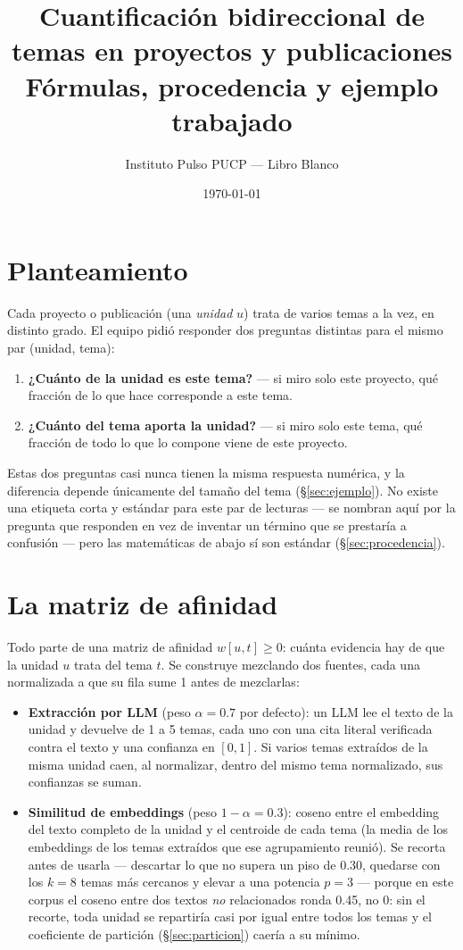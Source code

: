 \documentclass[11pt]{article}
\title{Cuantificación bidireccional de temas en proyectos y publicaciones\\
\large Fórmulas, procedencia y ejemplo trabajado}
\author{Instituto Pulso PUCP --- Libro Blanco}
\date{\today}
\newcommand{\afinidad}{w}
\begin{document}
\maketitle

\section{Planteamiento}

Cada proyecto o publicación (una \emph{unidad} $u$) trata de varios temas a la
vez, en distinto grado. El equipo pidió responder dos preguntas distintas
para el mismo par (unidad, tema):

\begin{enumerate}
  \item \textbf{¿Cuánto de la unidad es este tema?} --- si miro solo este
    proyecto, qué fracción de lo que hace corresponde a este tema.
  \item \textbf{¿Cuánto del tema aporta la unidad?} --- si miro solo este
    tema, qué fracción de todo lo que lo compone viene de este proyecto.
  \end{enumerate}

Estas dos preguntas casi nunca tienen la misma respuesta numérica, y la
diferencia depende únicamente del tamaño del tema (\S\ref{sec:ejemplo}). No
existe una etiqueta corta y estándar para este par de lecturas --- se nombran
aquí por la pregunta que responden en vez de inventar un término que se
prestaría a confusión --- pero las matemáticas de abajo sí son estándar
(\S\ref{sec:procedencia}).

\section{La matriz de afinidad}

Todo parte de una matriz de afinidad $\afinidad[u,t] \geq 0$: cuánta
evidencia hay de que la unidad $u$ trata del tema $t$. Se construye
mezclando dos fuentes, cada una normalizada a que su fila sume 1 antes de
mezclarlas:

\begin{itemize}
  \item \textbf{Extracción por LLM} (peso $\alpha = 0.7$ por defecto): un LLM
    lee el texto de la unidad y devuelve de 1 a 5 temas, cada uno con una
    cita literal verificada contra el texto y una confianza en $[0,1]$. Si
    varios temas extraídos de la misma unidad caen, al normalizar, dentro
    del mismo tema normalizado, sus confianzas se suman.
  \item \textbf{Similitud de embeddings} (peso $1-\alpha = 0.3$): coseno entre
    el embedding del texto completo de la unidad y el centroide de cada
    tema (la media de los embeddings de los temas extraídos que ese
    agrupamiento reunió). Se recorta antes de usarla --- descartar lo que no
    supera un piso de 0.30, quedarse con los $k=8$ temas más cercanos y
    elevar a una potencia $p=3$ --- porque en este corpus el coseno entre dos
    textos \emph{no} relacionados ronda 0.45, no 0: sin el recorte, toda
    unidad se repartiría casi por igual entre todos los temas y el
    coeficiente de partición (\S\ref{sec:particion}) caería a su mínimo.
\end{itemize}
\end{document}
